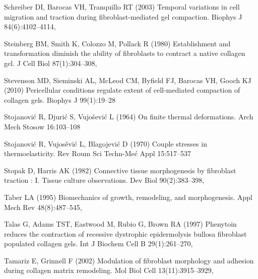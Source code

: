 \begin{thebibliography}{124}
Schreiber DI, Barocas VH, Tranquillo RT (2003) Temporal variations in cell
  migration and traction during fibroblast-mediated gel compaction. Biophys J
  84(6):4102--4114, 

Steinberg BM, Smith K, Colozzo M, Pollack R (1980) Establishment and
  transformation diminish the ability of fibroblasts to contract a native
  collagen gel. J Cell Biol 87(1):304--308, 

Stevenson MD, Sieminski AL, McLeod CM, Byfield FJ, Barocas VH, Gooch KJ (2010)
  Pericellular conditions regulate extent of cell-mediated compaction of
  collagen gels. Biophys J 99(1):19--28

Stojanovi{\'c} R, Djuri{\'c} S, Vujo{\v{s}}evi{\'c} L (1964) On finite thermal
  deformations. Arch Mech Stosow 16:103--108

Stojanovi{\'c} R, Vujos{\v{e}}vi{\'c} L, Blagojevi{\'c} D (1970) Couple
  stresses in thermoelasticity. Rev Roum Sci Techn-Me{\'c} Appl 15:517--537

Stopak D, Harris AK (1982) Connective tissue morphogenesis by fibroblast
  traction : {I}. {T}issue culture observations. Dev Biol 90(2):383--398,

Taber LA (1995) Biomechanics of growth, remodeling, and morphogenesis. Appl
  Mech Rev 48(8):487--545, 

Talas G, Adams TST, Eastwood M, Rubio G, Brown RA (1997) Phenytoin reduces the
  contraction of recessive dystrophic epidermolysis bullosa fibroblast
  populated collagen gels. Int J Biochem Cell B 29(1):261--270,

Tamariz E, Grinnell F (2002) Modulation of fibroblast morphology and adhesion
  during collagen matrix remodeling. Mol Biol Cell 13(11):3915--3929,


\end{thebibliography}
